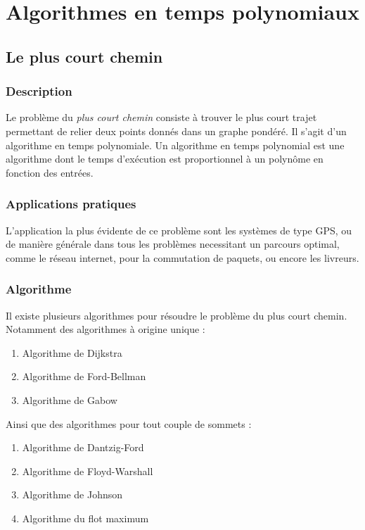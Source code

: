 \section{Algorithmes en temps polynomiaux}
    \subsection{Le plus court chemin}
        \subsubsection{Description}
        Le problème du \emph{plus court chemin} consiste à trouver
        le plus court trajet permettant de relier deux points donnés dans un graphe pondéré. 
	Il s'agit d'un algorithme en temps polynomiale. Un algorithme en temps polynomial est 
	une algorithme dont le temps d'exécution est proportionnel à un polynôme en fonction des entrées.
	
        \subsubsection{Applications pratiques}
            L'application la plus évidente de ce problème sont les systèmes de type
            GPS, ou de manière générale dans tous les problèmes necessitant
            un parcours optimal, comme le réseau internet, pour la commutation de
            paquets, ou encore les livreurs.
        \subsubsection{Algorithme} %
	Il existe plusieurs algorithmes pour résoudre le problème du plus court chemin. 
	Notamment des algorithmes à origine unique :
\begin{enumerate}
 \item Algorithme de Dijkstra
 \item Algorithme de Ford-Bellman
 \item Algorithme de Gabow
\end{enumerate}
	Ainsi que des algorithmes pour tout couple de sommets :
\begin{enumerate}
 \item Algorithme de Dantzig-Ford
 \item Algorithme de Floyd-Warshall
 \item Algorithme de Johnson
 \item Algorithme du flot maximum
\end{enumerate}

